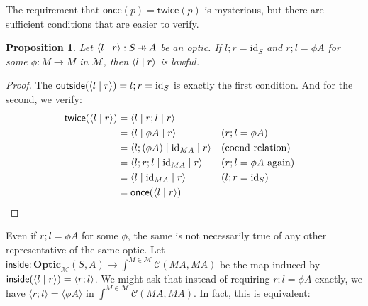 \documentclass[11pt,letterpaper]{article}
\theoremstyle{plain}
\newtheorem{proposition}[theorem]{Proposition}
\theoremstyle{definition}
\newcommand{\C}{\mathscr{C}}
\newcommand{\M}{\mathscr{M}}
\newcommand{\Optic}{\mathbf{Optic}}
\newcommand{\id}{\mathrm{id}}
\newcommand{\rep}[2]{{\ensuremath \left\langle #1 \mid #2 \right\rangle}}
\newcommand{\repthree}[3]{{\ensuremath \langle #1 \mid #2 \mid #3 \rangle}}
\newcommand{\inside}{\mathsf{inside}}
\newcommand{\outside}{\mathsf{outside}}
\newcommand{\once}{\mathsf{once}}
\newcommand{\twice}{\mathsf{twice}}
\newcommand{\hto}{\ensuremath{\,\mathaccent\shortmid\rightarrow\,}}
\begin{document}
The requirement that $\once(p) = \twice(p)$ is mysterious, but there are sufficient conditions that are easier to verify.

\begin{proposition}
  Let $\rep{l}{r} : S \hto A$ be an optic. If $l;r = \id_S$ and $r;l = \phi A$ for some $\phi : M \to M$ in $\M$, then $\rep{l}{r}$ is lawful.
\end{proposition}
\begin{proof}
  The $\outside(\rep{l}{r}) = l;r = \id_S$ is exactly the first condition. And for the second, we verify:
  \begin{align*}
    \twice(\rep{l}{r})
    &= \repthree{l}{r;l}{r} \\
    &= \repthree{l}{\phi A}{r} && \text{($r;l = \phi A$)}\\
    &= \repthree{l ; (\phi A)}{\id_{MA}}{r} && \text{(coend relation)} \\
    &= \repthree{l;r;l}{\id_{MA}}{r} && \text{($r;l = \phi A$ again)}\\
    &= \repthree{l}{\id_{MA}}{r}  && \text{($l;r = \id_S$)}\\
    &= \once(\rep{l}{r})
  \end{align*}
\end{proof}

Even if $r;l = \phi A$ for some $\phi$, the same is not necessarily true of any other representative of the same optic. Let $\inside : \Optic_\M(S, A) \to \int^{M \in \M} \C(M A, M A)$ be the map induced by $\inside(\rep{l}{r}) = \langle r ; l \rangle$. We might ask that instead of requiring $r;l = \phi A$ exactly, we have $\langle r ; l \rangle = \langle \phi A \rangle$ in $\int^{M \in \M} \C(M A, M A)$. In fact, this is equivalent:
\end{document}
